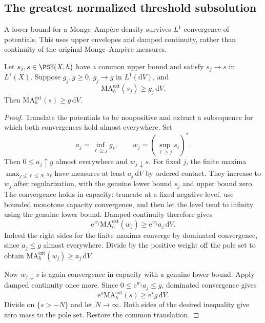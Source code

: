 \subsection{The greatest normalized threshold subsolution}

A lower bound for a Monge--Amp\`ere density survives $L^1$ convergence of potentials. This uses upper envelopes and damped continuity, rather than continuity of the original Monge--Amp\`ere measures.

\begin{lemma}\label{lem:density-subsolution-lone-closure}
Let $s_j,s\in\PSH(X,h)$ have a common upper bound and satisfy $s_j\to s$ in $L^1(X)$. Suppose $g_j,g\geq0$, $g_j\to g$ in $L^1(\mathrm{d}V)$, and
\[
 \mathrm{MA}^{\mathrm{ext}}_h(s_j)\geq g_j\,\mathrm{d}V.
\]
Then $\mathrm{MA}^{\mathrm{ext}}_h(s)\geq g\,\mathrm{d}V$.
\end{lemma}
\begin{proof}
Translate the potentials to be nonpositive and extract a subsequence for which both convergences hold almost everywhere. Set
\[
 a_j=\inf_{\ell\geq j}g_\ell,\qquad
 w_j=\left(\sup_{\ell\geq j}s_\ell\right)^*.
\]
Then $0\leq a_j\uparrow g$ almost everywhere and $w_j\downarrow s$. For fixed $j$, the finite maxima $\max_{j\leq\ell\leq N}s_\ell$ have measures at least $a_j\,\mathrm{d}V$ by ordered contact. They increase to $w_j$ after regularization, with the genuine lower bound $s_j$ and upper bound zero. The convergence holds in capacity: truncate at a fixed negative level, use bounded monotone capacity convergence, and then let the level tend to infinity using the genuine lower bound. Damped continuity therefore gives
\[
 \mathrm{e}^{w_j}\mathrm{MA}^{\mathrm{ext}}_h(w_j)
       \geq \mathrm{e}^{w_j}a_j\,\mathrm{d}V.
\]
Indeed the right sides for the finite maxima converge by dominated convergence, since $a_j\leq g$ almost everywhere. Divide by the positive weight off the pole set to obtain $\mathrm{MA}^{\mathrm{ext}}_h(w_j)\geq a_j\,\mathrm{d}V$.

Now $w_j\downarrow s$ is again convergence in capacity with a genuine lower bound. Apply damped continuity once more. Since $0\leq\mathrm{e}^{w_j}a_j\leq g$, dominated convergence gives
\[
 \mathrm{e}^s\mathrm{MA}^{\mathrm{ext}}_h(s)
       \geq\mathrm{e}^s g\,\mathrm{d}V.
\]
Divide on $\{s>-N\}$ and let $N\to\infty$. Both sides of the desired inequality give zero mass to the pole set. Restore the common translation.
\end{proof}

